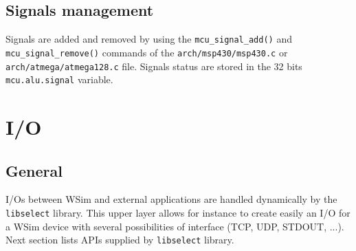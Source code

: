 \documentclass[a4paper,10pt]{report}
\begin{document}
\subsection{Signals management}
Signals are added and removed by using the \verb$mcu_signal_add()$ and \verb$mcu_signal_remove()$ commands of the \verb$arch/msp430/msp430.c$ or \verb$arch/atmega/atmega128.c$ file.
Signals status are stored in the 32 bits \verb$mcu.alu.signal$ variable.





\section{I/O}
\subsection{General}
I/Os between WSim and external applications are handled dynamically by the \verb$libselect$ library. This upper layer allows for instance to create easily an I/O for a WSim device with several possibilities of interface (TCP, UDP, STDOUT, ...). Next section lists APIs supplied by \verb$libselect$ library.
\end{document}
